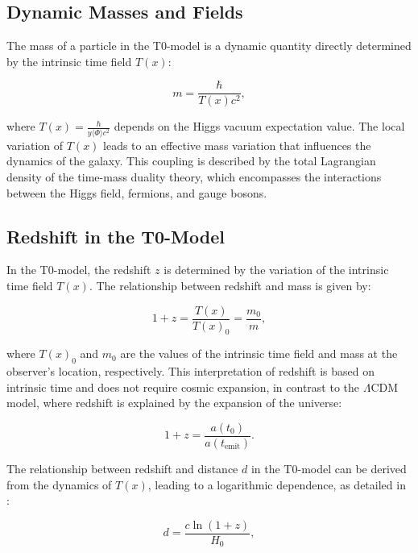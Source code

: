 \documentclass[a4paper,12pt]{article}
\newcommand{\Tfield}{T(x)}
\begin{document}
	\subsection{Dynamic Masses and Fields}
	
	The mass of a particle in the T0-model is a dynamic quantity directly determined by the intrinsic time field \( \Tfield \):
	
	\begin{equation}
		m = \frac{\hbar}{\Tfield c^2},
	\end{equation}
	
	where \( \Tfield = \frac{\hbar}{y \langle \Phi \rangle c^2} \) depends on the Higgs vacuum expectation value. The local variation of \( \Tfield \) leads to an effective mass variation that influences the dynamics of the galaxy. This coupling is described by the total Lagrangian density of the time-mass duality theory, which encompasses the interactions between the Higgs field, fermions, and gauge bosons.
	
	\subsection{Redshift in the T0-Model}
	
	In the T0-model, the redshift \( z \) is determined by the variation of the intrinsic time field \( \Tfield \). The relationship between redshift and mass is given by:
	
	\begin{equation}
		1 + z = \frac{\Tfield}{\Tfield_0} = \frac{m_0}{m},
	\end{equation}
	
	where \( \Tfield_0 \) and \( m_0 \) are the values of the intrinsic time field and mass at the observer's location, respectively. This interpretation of redshift is based on intrinsic time and does not require cosmic expansion, in contrast to the \( \Lambda \)CDM model, where redshift is explained by the expansion of the universe:
	
	\begin{equation}
		1 + z = \frac{a(t_0)}{a(t_{\text{emit}})}.
	\end{equation}
	
	The relationship between redshift and distance \( d \) in the T0-model can be derived from the dynamics of \( \Tfield \), leading to a logarithmic dependence, as detailed in \cite{pascher_messdifferenzen_2025}:
	
	\begin{equation}
		d = \frac{c \ln(1 + z)}{H_0},
	\end{equation}
	
\end{document}
